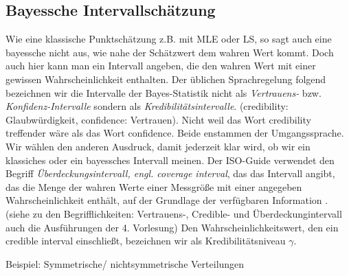 \subsection{Bayessche Intervallschätzung}
Wie eine klassische Punktschätzung z.B. mit MLE oder LS, so sagt auch eine bayessche nicht aus, wie nahe der Schätzwert dem wahren Wert kommt. Doch auch hier kann man ein Intervall angeben, die
den wahren Wert mit einer gewissen Wahrscheinlichkeit enthalten. Der üblichen Sprachregelung folgend bezeichnen wir die Intervalle der Bayes-Statistik nicht als \textit{Vertrauens-} bzw. \textit{Konfidenz-Intervalle} sondern als
\textit{Kredibilitätsintervalle}. (credibility: Glaubwürdigkeit, confidence: Vertrauen).
Nicht weil das Wort credibility treffender wäre als das Wort confidence. Beide enstammen der Umgangssprache. Wir wählen den anderen Ausdruck, damit jederzeit klar wird, ob wir ein klassiches oder ein bayessches Intervall meinen.
Der ISO-Guide verwendet den Begriff
\textit{Überdeckungsintervall, engl. coverage interval},
das das Intervall angibt, das die Menge der wahren Werte einer Messgröße
mit einer angegeben Wahrscheinlichkeit enthält, auf der Grundlage der
verfügbaren Information \cite{VIM08}.
(siehe zu den Begrifflichkeiten: Vertrauens-, Credible- und Überdeckungintervall auch die Ausführungen der 4. Vorlesung)
Den Wahrscheinlichkeitswert, den ein credible interval einschließt, bezeichnen wir als Kredibilitätsniveau $\gamma.$

Beispiel: Symmetrische/ nichtsymmetrische Verteilungen


